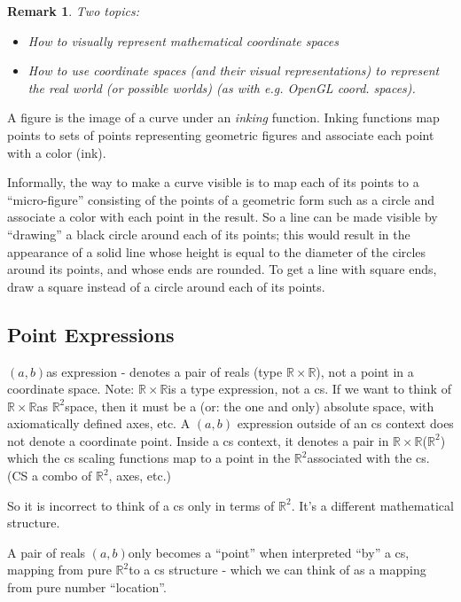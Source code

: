 \documentclass[12pt]{tufte-handout}
\numberwithin{equation}{subsection}
\numberwithin{equation}{subsection}
\newtheorem{remark}{Remark}
\newcommand\cspace{coordinate space}
\newcommand\ab{\((a,b)\)}
\newcommand\RR{\(\mathds{R}\times\mathds{R}\)}
\newcommand\Rtwo{\(\mathds{R}^2\)}
\begin{document}
{  \begin{remark}
    Two topics:
    \begin{itemize}
    \item How to visually represent mathematical \cspace{}s
    \item How to use \cspace{}s (and their visual representations) to
      represent the real world (or possible worlds) (as with e.g. OpenGL coord. spaces).
    \end{itemize}
  \end{remark}

  A figure is the image of a curve under an \textit{inking} function.
  Inking functions map points to sets of points representing geometric
  figures and associate each point with a color (ink).

  Informally, the way to make a curve visible is to map each of its
  points to a ``micro-figure'' consisting of the points of a geometric
  form such as a circle and associate a color with each point in the
  result.  So a line can be made visible by ``drawing'' a black circle
  around each of its points; this would result in the appearance of a
  solid line whose height is equal to the diameter of the circles
  around its points, and whose ends are rounded.  To get a line with
  square ends, draw a square instead of a circle around each of its
  points.


  \subsection{Point Expressions}
  \label{subs:pointexprs}

  \ab as expression - denotes a pair of reals (type \RR), not a point in
  a \cspace{}.  Note: \RR is a type expression, not a cs.  If we want to
  think of \RR as \Rtwo space, then it must be a (or: the one and only)
  absolute space, with axiomatically defined axes, etc.  A \ab
  expression outside of an cs context does not denote a coordinate
  point.  Inside a cs context, it denotes a pair in \RR (\Rtwo) which
  the cs scaling functions map to a point in the \Rtwo associated with
  the cs.  (CS a combo of \Rtwo, axes, etc.)

  So it is incorrect to think of a cs only in terms of \Rtwo.  It's a
  different mathematical structure.

  A pair of reals \ab only becomes a ``point'' when interpreted ``by'' a
  cs, mapping from pure \Rtwo to a cs structure - which we can think of
  as a mapping from pure number ``location''.

}
\end{document}

